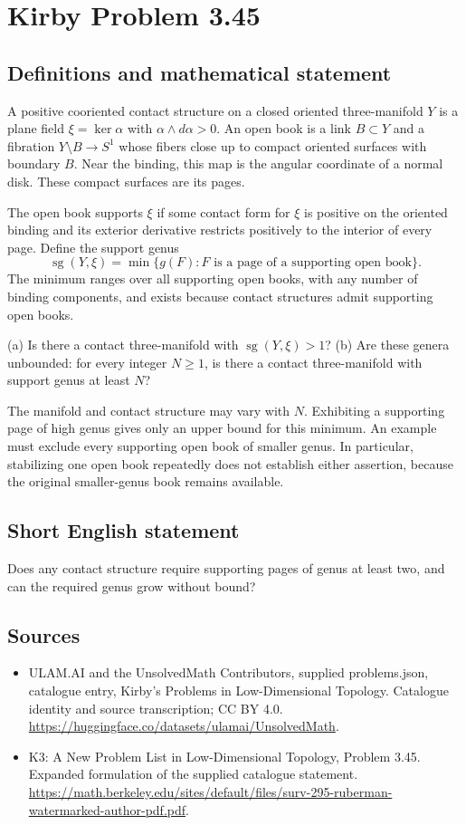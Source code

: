 \documentclass[11pt,a4paper]{article}
\begin{document}
\section*{Kirby Problem 3.45}\label{statement}

\subsection{Definitions and mathematical statement}
A positive cooriented contact structure on a closed oriented three-manifold $Y$ is a plane field $\xi=\ker\alpha$ with $\alpha\wedge d\alpha>0$. An open book is a link $B\subset Y$ and a fibration $Y\setminus B\to S^1$ whose fibers close up to compact oriented surfaces with boundary $B$. Near the binding, this map is the angular coordinate of a normal disk. These compact surfaces are its pages.

The open book supports $\xi$ if some contact form for $\xi$ is positive on the oriented binding and its exterior derivative restricts positively to the interior of every page. Define the support genus
\[
\operatorname{sg}(Y,\xi)=\min\{g(F):F\text{ is a page of a supporting open book}\}.
\]
The minimum ranges over all supporting open books, with any number of binding components, and exists because contact structures admit supporting open books.

(a) Is there a contact three-manifold with $\operatorname{sg}(Y,\xi)>1$? (b) Are these genera unbounded: for every integer $N\ge1$, is there a contact three-manifold with support genus at least $N$?

The manifold and contact structure may vary with $N$. Exhibiting a supporting page of high genus gives only an upper bound for this minimum. An example must exclude every supporting open book of smaller genus. In particular, stabilizing one open book repeatedly does not establish either assertion, because the original smaller-genus book remains available.
\subsection{Short English statement}
Does any contact structure require supporting pages of genus at least two, and can the required genus grow without bound?
\subsection{Sources}
\begin{itemize}
\item[S1] ULAM.AI and the UnsolvedMath Contributors, supplied problems.json, catalogue entry, Kirby's Problems in Low-Dimensional Topology. Catalogue identity and source transcription; CC BY 4.0.
\url{https://huggingface.co/datasets/ulamai/UnsolvedMath}.
\item[S2] K3: A New Problem List in Low-Dimensional Topology, Problem 3.45. Expanded formulation of the supplied catalogue statement.
\url{https://math.berkeley.edu/sites/default/files/surv-295-ruberman-watermarked-author-pdf.pdf}.
\end{itemize}
\end{document}
